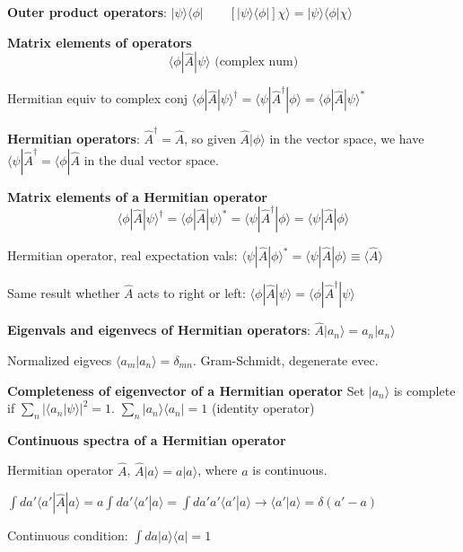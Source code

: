 \textbf{Outer product operators}: $| \psi \rangle \langle \phi | \qquad [|\psi \rangle \langle \phi |] \chi \rangle  = | \psi \rangle \langle \phi | \chi \rangle$

\textbf{Matrix elements of operators}
$$\langle \phi | \widehat{A} | \psi \rangle \textrm{ (complex num)}$$

Hermitian equiv to complex conj $\langle \phi | \widehat{A} | \psi \rangle^{\dag} = \langle \psi | \widehat{A}^{\dag} | \phi \rangle = \langle \phi | \widehat{A} | \psi \rangle ^*$

\textbf{Hermitian operators}: $\widehat{A}^{\dag} = \widehat{A}$, so given $\widehat{A} | \phi \rangle$ in the vector space, we have $\langle \psi | \widehat{A}^{\dag} = \langle \phi | \widehat{A}$ in the dual vector space.

\textbf{Matrix elements of a Hermitian operator}
$$\langle \phi | \widehat{A} | \psi \rangle^{\dag} = \langle \phi | \widehat{A} | \psi \rangle^* = \langle \psi | \widehat{A}^{\dag} | \phi \rangle = \langle \psi | \widehat{A} | \phi \rangle$$

Hermitian operator, real expectation vals: $\langle \psi | \widehat{A} | \phi \rangle ^* = \langle \psi | \widehat{A} | \phi \rangle \equiv \langle \widehat{A} \rangle$

Same result whether $\widehat{A}$ acts to right or left: $\langle \phi | \widehat{A} | \psi \rangle = \langle \phi | \widehat{A}^{\dag} | \psi \rangle$

\textbf{Eigenvals and eigenvecs of Hermitian operators}: $\widehat{A} |a_n \rangle = a_n | a_n \rangle$

Normalized eigvecs $\langle a_m | a_n \rangle = \delta_{mn}$. Gram-Schmidt, degenerate evec.

\textbf{Completeness of eigenvector of a Hermitian operator}
Set $|a_n \rangle$ is complete if $\sum_n |\langle a_n | \psi \rangle|^2 = 1$.
$\sum_n |a_n \rangle \langle a_n | = 1$ (identity operator)

\textbf{Continuous spectra of a Hermitian operator}

Hermitian operator $\widehat{A}$, $\widehat{A} | a \rangle = a | a \rangle$, where $a$ is continuous. 

$\int da' \langle a' | \widehat{A} | a \rangle = a \int da' \langle a' | a \rangle = \int da' a' \langle a' | a \rangle \rightarrow \langle a' | a \rangle = \delta (a' - a)$

Continuous condition: $\int da | a \rangle \langle a | = 1$

